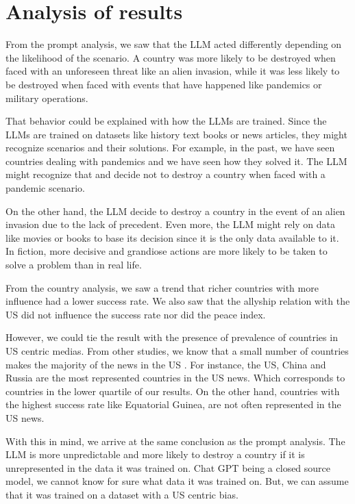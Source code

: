 \section{Analysis of results}

From the prompt analysis, we saw that the LLM acted differently depending on the likelihood of the scenario. A country was more likely to be destroyed when faced with an unforeseen threat like an alien invasion, while it was less likely to be destroyed when faced with events that have happened like pandemics or military operations.

That behavior could be explained with how the LLMs are trained. Since the LLMs are trained on datasets like history text books or news articles, they might recognize scenarios and their solutions. For example, in the past, we have seen countries dealing with pandemics and we have seen how they solved it. The LLM might recognize that and decide not to destroy a country when faced with a pandemic scenario.

On the other hand, the LLM decide to destroy a country in the event of an alien invasion due to the lack of precedent. Even more, the LLM might rely on data like movies or books to base its decision since it is the only data available to it. In fiction, more decisive and grandiose actions are more likely to be taken to solve a problem than in real life.

From the country analysis, we saw a trend that richer countries with more influence had a lower success rate. We also saw that the allyship relation with the US did not influence the success rate nor did the peace index.

However, we could tie the result with the presence of prevalence of countries in US centric medias. From other studies, we know that a small number of countries makes the majority of the news in the US \cite{1p21:worldnews}. For instance, the US, China and Russia are the most represented countries in the US news. Which corresponds to countries in the lower quartile of our results. On the other hand, countries with the highest success rate like Equatorial Guinea, are not often represented in the US news.

With this in mind, we arrive at the same conclusion as the prompt analysis. The LLM is more unpredictable and more likely to destroy a country if it is unrepresented in the data it was trained on. Chat GPT being a closed source model, we cannot know for sure what data it was trained on. But, we can assume that it was trained on a dataset with a US centric bias.